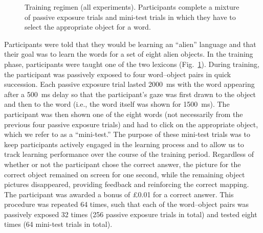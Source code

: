 \documentclass[doc,biblatex,floatsintext]{apa7}
\begin{document}
\begin{figure}
\vspace*{2pt}
\caption{Training regimen (all experiments). Participants complete a mixture of passive exposure trials and mini-test trials in which they have to select the appropriate object for a word.}
\label{fig03}
\end{figure}

Participants were told that they would be learning an ``alien'' language and that their goal was to learn the words for a set of eight alien objects. In the training phase, participants were taught one of the two lexicons (Fig.~\ref{fig03}). During training, the participant was passively exposed to four word--object pairs in quick succession. Each passive exposure trial lasted 2000~ms with the word appearing after a 500~ms delay so that the participant's gaze was first drawn to the object and then to the word (i.e., the word itself was shown for 1500~ms). The participant was then shown one of the eight words (not necessarily from the previous four passive exposure trials) and had to click on the appropriate object, which we refer to as a ``mini-test.'' The purpose of these mini-test trials was to keep participants actively engaged in the learning process and to allow us to track learning performance over the course of the training period. Regardless of whether or not the participant chose the correct answer, the picture for the correct object remained on screen for one second, while the remaining object pictures disappeared, providing feedback and reinforcing the correct mapping. The participant was awarded a bonus of £0.01 for a correct answer. This procedure was repeated 64 times, such that each of the word--object pairs was passively exposed 32 times (256 passive exposure trials in total) and tested eight times (64 mini-test trials in total).
\end{document}
